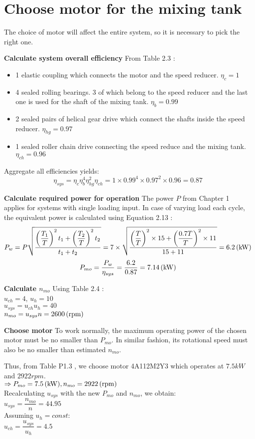 \section{Choose motor for the mixing tank}
The choice of motor will affect the entire system, so it is necessary to pick the right one.

\textbf{Calculate system overall efficiency} From Table 2.3 \cite{tk1}:
\begin{itemize}
	\item 1 elastic coupling which connects the motor and the speed reducer. $ \eta_c = 1 $
	\item 4 sealed rolling bearings. 3 of which belong to the speed reducer and the last one is used for the shaft of the mixing tank. $ \eta_b = 0.99 $
	\item 2 sealed pairs of helical gear drive which connect the shafts inside the speed reducer. $ \eta_{hg} = 0.97 $
	\item 1 sealed roller chain drive connecting the speed reduce and the mixing tank. $ \eta_{ch} = 0.96 $
\end{itemize}
Aggregate all efficiencies yields: 
\[\eta_{sys} = \eta_c\eta_b^4\eta_{hg}^2\eta_{ch} = 1 \times 0.99^4 \times 0.97^2 \times 0.96 = 0.87\]

\textbf{Calculate required power for operation}
The power $ P $ from Chapter 1 applies for systems with single loading input. In case of varying load each cycle, the equivalent power is calculated using  Equation 2.13 \cite{tk1}:
\[
P_w = P\sqrt{\dfrac{\left(\dfrac{T_1}{T}\right)^2t_1 + \left(\dfrac{T_2}{T}\right)^2t_2}{t_1+t_2}} = 7 \times \sqrt{\dfrac{\left(\dfrac{T}{T}\right)^2\times15 + \left(\dfrac{0.7T}{T}\right)^2\times11}{15+11}} = 6.2 \, (\mathrm{kW})
\]
\[
P_{mo} = \dfrac{P_w}{\eta_{sys}} = \dfrac{6.2}{0.87} = 7.14 \, (\mathrm{kW})
\]

\textbf{Calculate $ n_{mo} $} Using Table 2.4 \cite{tk1}:\\
$ u_{ch} = 4$, $ u_{h} = 10$\\
$ u_{sys} = u_{ch}u_{h} = 40 $\\
$ n_{mo} = u_{sys}n = 2600  \, (\mathrm{rpm}) $

\textbf{Choose motor}
To work normally, the maximum operating power of the chosen motor must be no smaller than $ P_{mo} $. In similar fashion, its rotational speed must also be no smaller than estimated $ n_{mo} $.

Thus, from Table P1.3 \cite{tk1}, we choose motor 4A112M2Y3 which operates at $ 7.5\unit{kW} $ and $ 2922\unit{rpm} $.\\
$\Rightarrow P_{mo} = 7.5\, (\mathrm{kW}), n_{mo} = 2922\, (\mathrm{rpm})$\\
Recalculating $ u_{sys} $ with the new $ P_{mo} $ and $ n_{mo} $, we obtain:\\
$ u_{sys} = \dfrac{n_{mo}}{n} = 44.95	$\\
Assuming $ u_{h} = const $:\\
$ u_{ch} = \dfrac{u_{sys}}{u_{h}} = 4.5$

